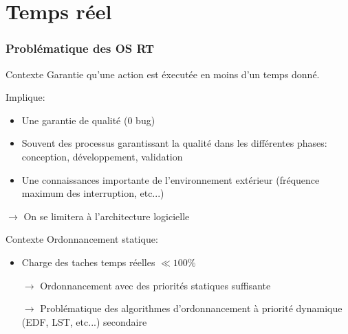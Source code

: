%
%

\part{Temps réel}

\begin{frame}
  \partpage
\end{frame}

\begin{frame}
  \tableofcontents[currentpart]
\end{frame}

\section{Problématique des OS RT} %

\begin{frame}{Contexte}
  Garantie qu'une action est éxecutée en moins d'un temps donné.

  Implique:
  \begin{itemize}
  \item Une garantie de qualité (0 bug)
  \item  Souvent  des  processus  garantissant  la  qualité  dans  les
    différentes phases: conception, développement, validation
  \item  Une  connaissances  importante de  l'environnement  extérieur
    (fréquence maximum des interruption, etc...)
  \end{itemize}
  $\to$ On se limitera à l'architecture logicielle
\end{frame}

\begin{frame}{Contexte}
  Ordonnancement statique:
  \begin{itemize}
    \item Charge des taches temps réelles $\ll 100\%$
    \item[$\to$]   Ordonnancement   avec   des   priorités   statiques
      suffisante
    \item[$\to$]  Problématique  des  algorithmes  d'ordonnancement  à
      priorité dynamique (EDF, LST, etc...) secondaire
  \end{itemize}
\end{frame}

